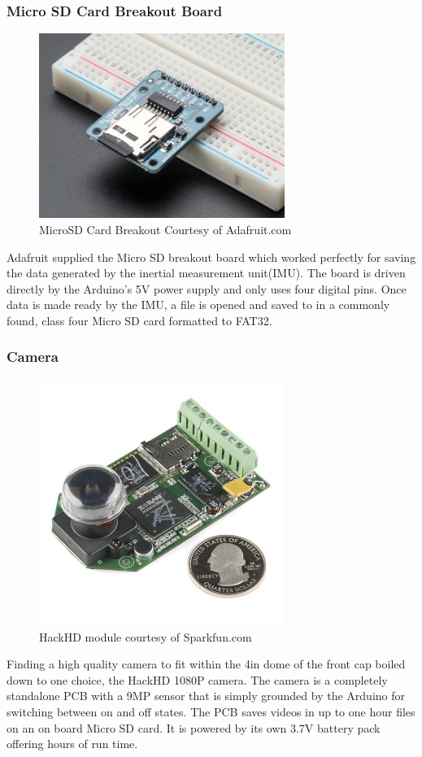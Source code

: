 \documentclass{report}
\begin{document}
\subsubsection{Micro SD Card Breakout Board}
\begin{figure}[H]
\centering
\includegraphics[width=8cm]{"sd"}
\caption{MicroSD Card Breakout Courtesy of Adafruit.com}
\end{figure}
Adafruit supplied the Micro SD breakout board which worked perfectly for saving the data generated by the inertial measurement unit(IMU).  The board is driven directly by the Arduino’s 5V power supply and only uses four digital pins.  Once data is made ready by the IMU, a file is opened and saved to in a commonly found,  class four Micro SD card formatted to FAT32.  
\subsubsection{Camera}
\begin{figure}[H]
\centering
\includegraphics[width=8cm]{"camera"}
\caption{HackHD module courtesy of Sparkfun.com}
\end{figure}
Finding a high quality camera to fit within the 4in dome of the front cap boiled down to one choice, the HackHD 1080P camera.  The camera is a completely standalone PCB with a 9MP sensor that is simply grounded by the Arduino for switching between on and off states.  The PCB saves videos in up to one hour files on an on board Micro SD card.  It is powered by its own 3.7V battery pack offering hours of run time.  
\end{document}
